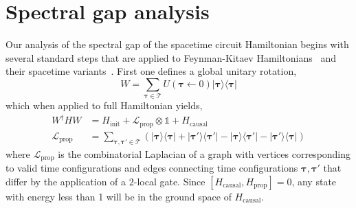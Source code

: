 \documentclass[11pt,letterpaper]{article}
\theoremstyle{definition}
\theoremstyle{remark}
\numberwithin{equation}{section}
\theoremstyle{definition}
\begin{document}
%
%
%
%

%
%
%
%
%
%
%
%
%
%
%
%
%

%

%

%

%

%
%
%

%

%
%


%


%

\section{Spectral gap analysis}
\label{sec:analysis}

Our analysis of the spectral gap of the spacetime circuit Hamiltonian begins with several standard steps that are applied to Feynman-Kitaev Hamiltonians~\cite{aharonov2008adiabatic} and their spacetime variants~\cite{breuckmann2014space}.  First one defines a global unitary rotation,
\begin{equation}
W = \sum_{\boldsymbol{\tau} \in \mathcal{T}} U(\boldsymbol{\tau} \leftarrow 0) |\boldsymbol{\tau}\rangle \langle \boldsymbol{\tau}|
\end{equation}
which when applied to full Hamiltonian yields,
\begin{align}
W^\dagger H W&= H_\textrm{init}  + \mathcal{L}_{\textrm{prop}} \otimes \mathds{1} + H_\textrm{causal} \label{eq:rotatedH}\\
\mathcal{L}_{\textrm{prop}}  &= \sum_{\boldsymbol{\tau},\boldsymbol{\tau'} \in \mathcal{T}} \left( |\boldsymbol{\tau}\rangle \langle \boldsymbol{\tau} | + |\boldsymbol{\tau'}\rangle \langle \boldsymbol{\tau'}| - |\boldsymbol{\tau}\rangle \langle \boldsymbol{\tau'} | - |\boldsymbol{\tau'}\rangle \langle \boldsymbol{\tau} | \right)
\end{align}
where $\mathcal{L}_{\textrm{prop}}$ is the combinatorial Laplacian of a graph with vertices corresponding to valid time configurations and edges connecting time configurations $\boldsymbol{\tau},\boldsymbol{\tau'}$ that differ by the application of a 2-local gate.  Since $[H_{\textrm{causal}}, H_{\textrm{prop}}] = 0$, any state with energy less than 1 will be in the ground space of $H_\textrm{causal}$. 
\end{document}
